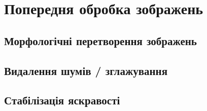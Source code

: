 \section{Попередня обробка зображень}
\subsection{Морфологічні перетворення зображень}
\subsection{Видалення шумів / зглажування}
\subsection{Стабілізація яскравості}